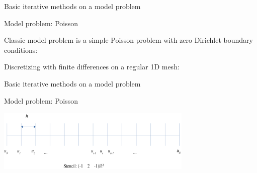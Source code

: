 \documentclass[18pt,xcolor=table]{beamer}
\begin{document}
\begin{frame}{Basic iterative methods on a model problem}
\begin{block}{Model problem: Poisson}
\bit
\item Classic model problem is a simple Poisson problem with zero Dirichlet boundary conditions:
\item Discretizing with finite differences on a regular 1D mesh:
\eit
{}
\end{block}
\end{frame}

\begin{frame}{Basic iterative methods on a model problem}
\begin{block}{Model problem: Poisson}
\begin{center}
\includegraphics[width=0.7\textwidth]{../figures/1DFDPoisson}
\end{center}
\end{block}
\end{frame}
\end{document}
